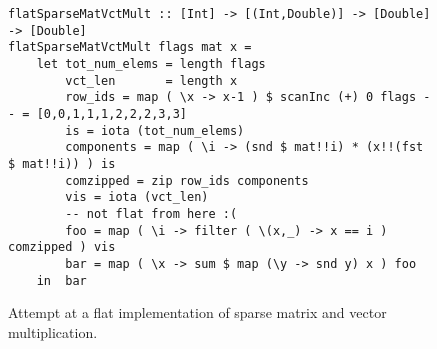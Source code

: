 \begin{figure}
    \begin{lstlisting}
flatSparseMatVctMult :: [Int] -> [(Int,Double)] -> [Double] -> [Double]
flatSparseMatVctMult flags mat x =
    let tot_num_elems = length flags
        vct_len       = length x
        row_ids = map ( \x -> x-1 ) $ scanInc (+) 0 flags -- = [0,0,1,1,1,2,2,2,3,3]
        is = iota (tot_num_elems)
        components = map ( \i -> (snd $ mat!!i) * (x!!(fst $ mat!!i)) ) is
        comzipped = zip row_ids components
        vis = iota (vct_len)
        -- not flat from here :(
        foo = map ( \i -> filter ( \(x,_) -> x == i ) comzipped ) vis
        bar = map ( \x -> sum $ map (\y -> snd y) x ) foo
    in  bar
    \end{lstlisting}
    \caption{Attempt at a flat implementation of sparse matrix and vector
    multiplication.}
    \label{fig:t1c2code}
\end{figure}
